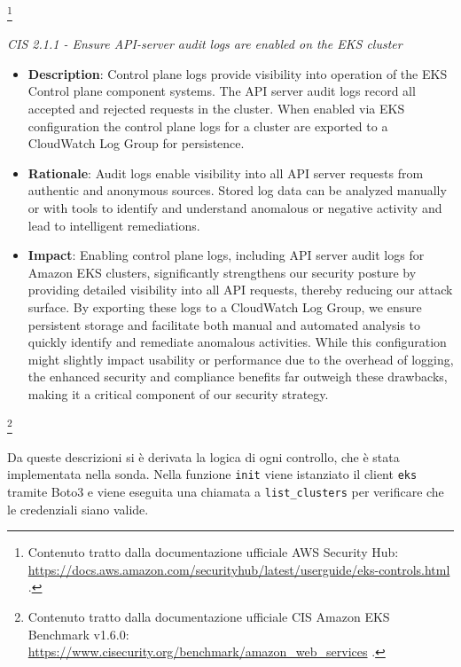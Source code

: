 \begin{mdframed}[backgroundcolor=gray!05, linecolor=gray!50]
\begin{itemize}
\begin{itemize}
    \end{itemize}
\end{itemize}
\end{mdframed}

\footnote{Contenuto tratto dalla documentazione ufficiale AWS Security Hub: \url{https://docs.aws.amazon.com/securityhub/latest/userguide/eks-controls.html} .}

\begin{mdframed}[backgroundcolor=gray!05, linecolor=gray!50]
\itshape
CIS 2.1.1 - Ensure API-server audit logs are enabled on the EKS cluster
\begin{itemize}
    \item \textbf{Description}: Control plane logs provide visibility into operation of the EKS Control plane component systems. The API server audit logs record all accepted and rejected requests in the cluster. When enabled via EKS configuration the control plane logs for a cluster are exported to a CloudWatch Log Group for persistence.
    \item \textbf{Rationale}: Audit logs enable visibility into all API server requests from authentic and anonymous sources. Stored log data can be analyzed manually or with tools to identify and understand anomalous or negative activity and lead to intelligent remediations.
    \item \textbf{Impact}: Enabling control plane logs, including API server audit logs for Amazon EKS clusters, significantly strengthens our security posture by providing detailed visibility into all API requests, thereby reducing our attack surface. By exporting these logs to a CloudWatch Log Group, we ensure persistent storage and facilitate both manual and automated analysis to quickly identify and remediate anomalous activities. While this configuration might slightly impact usability or performance due to the overhead of logging, the enhanced security and compliance benefits far outweigh these drawbacks, making it a critical component of our security strategy.
\end{itemize}
\end{mdframed}
\footnote{Contenuto tratto dalla documentazione ufficiale CIS Amazon EKS Benchmark v1.6.0: \url{https://www.cisecurity.org/benchmark/amazon_web_services} .}

Da queste descrizioni si è derivata la logica di ogni controllo, che è stata implementata nella sonda. Nella funzione \texttt{init} viene istanziato il client \texttt{eks} tramite Boto3 e viene eseguita una chiamata a \texttt{list\_clusters} per verificare che le credenziali siano valide.

